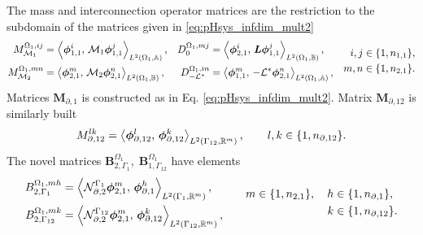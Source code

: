 The mass and interconnection operator matrices are the restriction to the subdomain of the matrices given in \eqref{eq:pHsys_infdim_mult2}
\begin{equation}
\begin{aligned}
{M}_{\mathcal{M}_1}^{\Omega_1, ij} &= \inner[L^2(\Omega_1, \mathbb{A})]{\bm{\phi}_{1, 1}^i}{\mathcal{M}_1\bm{\phi}_{1, 1}^j}, \\
{M}_{\mathcal{M}_2}^{\Omega_1, mn} &= \inner[L^2(\Omega_1, \mathbb{B})]{\bm{\phi}_{2, 1}^m}{\mathcal{M}_2\bm{\phi}_{2, 1}^n}, 
\end{aligned} \quad 
\begin{aligned}
{D}_{0}^{\Omega_1, mj} &= \inner[L^2(\Omega_1, \mathbb{B})]{\bm{\phi}_{2, 1}^i}{\bm{L}\bm{\phi}_{1, 1}^j}, \\
{D}_{-\mathcal{L}^*}^{\Omega_1, in} &= \inner[L^2(\Omega_1, \mathbb{A})]{\bm{\phi}_{1, 1}^m}{-\mathcal{L}^*\bm{\phi}_{2, 1}^n}, 
\end{aligned} \quad
\begin{aligned}
i,j &\in \{1,n_{1, 1}\}, \\
m,n &\in \{1,n_{2, 1}\}.
\end{aligned}
\end{equation} 
Matrices $\mathbf{M}_{\partial, 1}$ is constructed as in Eq. \eqref{eq:pHsys_infdim_mult2}. Matrix $\mathbf{M}_{\partial, 12}$ is similarly built 
\begin{equation}
{M}_{\partial, 12}^{lk} =\inner[L^2(\Gamma_{12}, \mathbb{R}^m)]{\bm{\phi}_{\partial, 12}^l}{\bm{\phi}_{\partial, {12}}^k}, \qquad l,k \in \{1,n_{\partial, 12}\}.
\end{equation}
The novel matrices  $\mathbf{B}_{2, \Gamma_1}^{\Omega_1}, \; \mathbf{B}_{1, \Gamma_{12}}^{\Omega_1}$ have elements
\begin{equation}
\begin{aligned}
{B}_{2, \Gamma_1}^{\Omega_1, mh} &= \inner[L^2(\Gamma_{1}, \mathbb{R}^m)]{\mathcal{N}_{\partial, 2}^{\Gamma_1}\bm{\phi}_{2, 1}^m}{\bm{\phi}_{\partial, 1}^h}, \\
{B}_{2, \Gamma_{12}}^{\Omega_1, mk} &= \inner[L^2(\Gamma_{12}, \mathbb{R}^m)]{\mathcal{N}_{\partial, 2}^{\Gamma_{12}}\bm{\phi}_{2, 1}^m}{\bm{\phi}_{\partial, 12}^k}, 
\end{aligned} \qquad 
\begin{aligned}
m \in \{1,n_{2, 1}\}, \quad h &\in \{1,n_{\partial, 1}\}, \\
k &\in \{1,n_{\partial, 12}\}.
\end{aligned}
\end{equation} 


